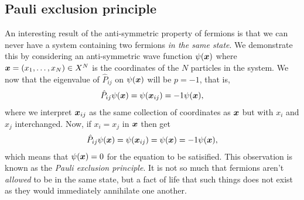         \subsection{Pauli exclusion principle}
            An interesting result of the anti-symmetric property of fermions is
            that we can never have a system containing two fermions \emph{in the
            same state}.
            We demonstrate this by considering an anti-symmetric wave function
            $\psi(\boldsymbol{x})$ where $\boldsymbol{x} = (x_1, \dots, x_N) \in X^{N}$ is the
            coordinates of the $N$ particles in the system.
            We now that the eigenvalue of $\hat{P}_{ij}$ on $\psi(\boldsymbol{x})$ will
            be $p = -1$, that is,
            \begin{align}
                \hat{P}_{ij}\psi(\boldsymbol{x})
                = \psi(\boldsymbol{x}_{ij})
                = -1\psi(\boldsymbol{x}),
            \end{align}
            where we interpret $\boldsymbol{x}_{ij}$ as the same collection of
            coordinates as $\boldsymbol{x}$ but with $x_i$ and $x_j$ interchanged.
            Now, if $x_i = x_j$ in $\boldsymbol{x}$ then get
            \begin{gather}
                \hat{P}_{ij}\psi(\boldsymbol{x})
                = \psi(\boldsymbol{x}_{ij})
                = \psi(\boldsymbol{x})
                = -1\psi(\boldsymbol{x}),
            \end{gather}
            which means that $\psi(\boldsymbol{x}) = 0$ for the equation to be
            satisified.
            This observation is known as the \emph{Pauli exclusion
            principle}.
            It is not so much that fermions aren't \emph{allowed} to be in the
            same state, but a fact of life that such things does not exist as
            they would immediately annihilate one another.


